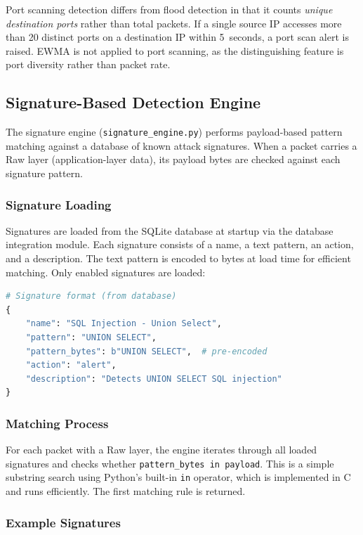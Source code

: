 \documentclass[12pt,a4paper]{article}
\begin{document}
Port scanning detection differs from flood detection in that it counts \emph{unique destination ports} rather than total packets. If a single source IP accesses more than 20 distinct ports on a destination IP within 5~seconds, a port scan alert is raised. EWMA is not applied to port scanning, as the distinguishing feature is port diversity rather than packet rate.

\subsection{Signature-Based Detection Engine}
\label{sec:signature}

The signature engine (\texttt{signature\_engine.py}) performs payload-based pattern matching against a database of known attack signatures. When a packet carries a Raw layer (application-layer data), its payload bytes are checked against each signature pattern.

\subsubsection{Signature Loading}

Signatures are loaded from the SQLite database at startup via the database integration module. Each signature consists of a name, a text pattern, an action, and a description. The text pattern is encoded to bytes at load time for efficient matching. Only enabled signatures are loaded:

\begin{lstlisting}[language=python]
# Signature format (from database)
{
    "name": "SQL Injection - Union Select",
    "pattern": "UNION SELECT",
    "pattern_bytes": b"UNION SELECT",  # pre-encoded
    "action": "alert",
    "description": "Detects UNION SELECT SQL injection"
}
\end{lstlisting}

\subsubsection{Matching Process}

For each packet with a Raw layer, the engine iterates through all loaded signatures and checks whether \texttt{pattern\_bytes in payload}. This is a simple substring search using Python's built-in \texttt{in} operator, which is implemented in C and runs efficiently. The first matching rule is returned.

\subsubsection{Example Signatures}
\end{document}
